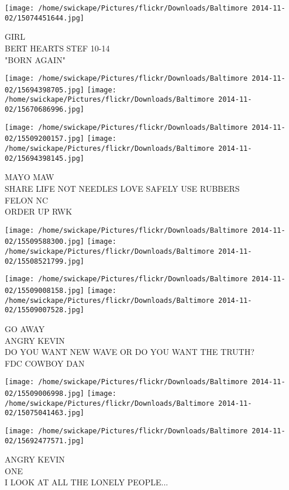 \documentclass[10pt,letterpaper]{article}
\begin{document}
\vspace{0.25in}
\texttt{[image: /home/swickape/Pictures/flickr/Downloads/Baltimore 2014-11-02/15074451644.jpg]}

GIRL\\
BERT HEARTS STEF 10{-}14\\
"BORN AGAIN"
\pagebreak

\texttt{[image: /home/swickape/Pictures/flickr/Downloads/Baltimore 2014-11-02/15694398705.jpg]}
\texttt{[image: /home/swickape/Pictures/flickr/Downloads/Baltimore 2014-11-02/15670686996.jpg]}

\texttt{[image: /home/swickape/Pictures/flickr/Downloads/Baltimore 2014-11-02/15509200157.jpg]}
\texttt{[image: /home/swickape/Pictures/flickr/Downloads/Baltimore 2014-11-02/15694398145.jpg]}

MAYO MAW\\
SHARE LIFE NOT NEEDLES LOVE SAFELY USE RUBBERS\\
FELON NC\\
ORDER UP RWK
\pagebreak

\texttt{[image: /home/swickape/Pictures/flickr/Downloads/Baltimore 2014-11-02/15509588300.jpg]}
\texttt{[image: /home/swickape/Pictures/flickr/Downloads/Baltimore 2014-11-02/15508521799.jpg]}

\texttt{[image: /home/swickape/Pictures/flickr/Downloads/Baltimore 2014-11-02/15509008158.jpg]}
\texttt{[image: /home/swickape/Pictures/flickr/Downloads/Baltimore 2014-11-02/15509007528.jpg]}

GO AWAY\\
ANGRY KEVIN\\
DO YOU WANT NEW WAVE OR DO YOU WANT THE TRUTH?\\
FDC COWBOY DAN
\pagebreak

\texttt{[image: /home/swickape/Pictures/flickr/Downloads/Baltimore 2014-11-02/15509006998.jpg]}
\texttt{[image: /home/swickape/Pictures/flickr/Downloads/Baltimore 2014-11-02/15075041463.jpg]}

\texttt{[image: /home/swickape/Pictures/flickr/Downloads/Baltimore 2014-11-02/15692477571.jpg]}

ANGRY KEVIN\\
ONE\\
I LOOK AT ALL THE LONELY PEOPLE...
\pagebreak
\end{document}

